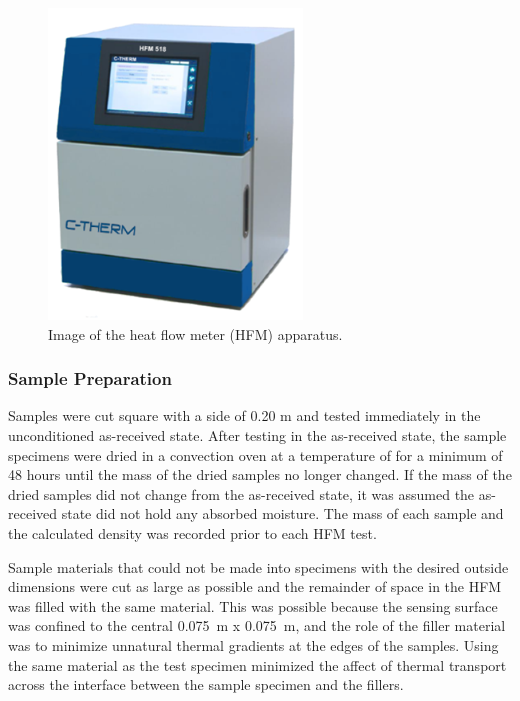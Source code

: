 \documentclass[12pt,oneside]{book}
\begin{document}
\begin{figure}[!ht]
\centering
\includegraphics[width=.75\columnwidth]{Figures/HFM.png}
\caption[Image of the Heat Flow Meter (HFM) Apparatus]{Image of the heat flow meter (HFM) apparatus.}
\label{fig:HFM_apparatus}
\end{figure}

\subsubsection{Sample Preparation}

Samples were cut square with a side of 0.20 m and tested immediately in the unconditioned as-received state. After testing in the as-received state, the sample specimens were dried in a convection oven at a temperature of  for a minimum of 48 hours until the mass of the dried samples no longer changed. If the mass of the dried samples did not change from the as-received state, it was assumed the as-received state did not hold any absorbed moisture. The mass of each sample and the calculated density was recorded prior to each HFM test.

Sample materials that could not be made into specimens with the desired outside dimensions were cut as large as possible and the remainder of space in the HFM was filled with the same material. This was possible because the sensing surface was confined to the central 0.075~m x 0.075~m, and the role of the filler material was to minimize unnatural thermal gradients at the edges of the samples. Using the same material as the test specimen minimized the affect of thermal transport across the interface between the sample specimen and the fillers.
\end{document}
